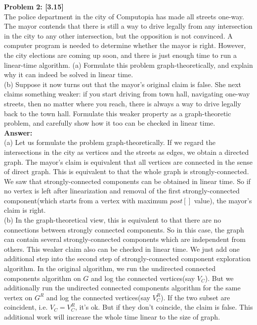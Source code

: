 \documentclass{article}
\begin{document}
\noindent
{\bf Problem 2: [3.15]}\\
The police department in the city of Computopia has made all streets one-way. The mayor contends that there is still a way to drive legally from any intersection in the city to any other intersection, but the opposition is not convinced. A computer program is needed to determine whether the mayor is right. However, the city elections are coming up soon, and there is just enough time to run a linear-time algorithm.
(a) Formulate this problem graph-theoretically, and explain why it can indeed be solved in
linear time.\\
(b)  Suppose it now turns out that the mayor’s original claim is false. She next claims something weaker: if you start driving from town hall, navigating one-way streets, then no matter where you reach, there is always a way to drive legally back to the town hall. Formulate this weaker property as a graph-theoretic problem, and carefully show how it too can be checked in linear time.\\
{\bf Answer:}\\
(a) Let us formulate the problem graph-theoretically. If we regard the intersections in the city as vertices and the streets as edges, we obtain a directed graph. The mayor's claim is equivalent that all vertices are connected in the sense of direct graph. This is equivalent to that the whole graph is strongly-connected. We saw that strongly-connected components can be obtained in linear time. So if no vertex is left after linearization and removal of the first strongly-connected component(which starts from a vertex with maximum $post[]$ value), the mayor's claim is right. \\
(b) In the graph-theoretical view, this is equivalent to that there are no connections between strongly connected components. So in this case, the graph can contain several strongly-connected components which are independent from others. This weaker claim also can be checked in linear time. We just add one additional step into the second step of strongly-connected component exploration algorithm. In the original algorithm, we run the undirected connected components algorithm on $G$ and log the connected vertices(say $V_C$). But we additionally run the undirected connected components algorithm for the same vertex on $G^R$ and log the connected vertices(say $V_C^R$). If the two subset are coincident, i.e. $V_C=V_C^R$, it's ok. But if they don't coincide, the claim is false. This additional work will increase the whole time linear to the size of graph.\\
\end{document}
